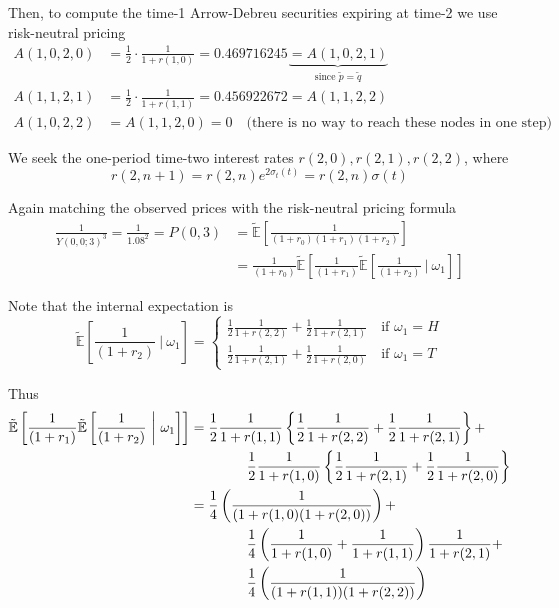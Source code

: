 \documentclass[12pt]{article}
\newcommand{\E}{\mathbb E}
\begin{document}
Then, to compute the time-1 Arrow-Debreu securities expiring at time-2 we use risk-neutral pricing
\begin{align*}
	A(1,0,2,0) &= \frac{1}{2} \cdot \frac{1}{1 + r(1,0)} = 0.469716245 \underbrace{ = A(1,0,2,1)}_{\text{since $\tilde{p} = \tilde{q}$}} \\
	A(1,1,2,1) &= \frac{1}{2} \cdot \frac{1}{1 + r(1,1)} = 0.456922672 = A(1,1,2,2) \\
	A(1,0,2,2) &= A(1,1,2,0) = 0 \quad \text{(there is no way to reach these nodes in one step)}
\end{align*}

We seek the one-period time-two interest rates $r(2,0), r(2,1), r(2,2)$, where
\begin{equation*}
	r(2,n + 1) = r(2,n)e^{2\sigma_t(t)} = r(2,n)\sigma(t)
\end{equation*}

Again matching the observed prices with the risk-neutral pricing formula
\begin{align*}
	\frac{1}{Y(0,0;3)^3} = \frac{1}{1.08^2} = P(0,3) &= \tilde{\E} \left[ \frac{1}{(1 + r_0)(1 + r_1)(1 + r_2)} \right] \\
	&= \frac{1}{(1 + r_0)} \tilde{\E} \left[ \frac{1}{(1 + r_1)} \tilde{\E} \left[ \frac{1}{(1 + r_2)} ~\bigg|~ \omega_1 \right] \right]
\end{align*}

Note that the internal expectation is
\begin{equation*}
	\tilde{\E} \left[ \frac{1}{(1 + r_2)} ~\bigg|~ \omega_1 \right] = 
	\begin{cases}
		\frac{1}{2} \frac{1}{1 + r(2,2)} + \frac{1}{2} \frac{1}{1 + r(2,1)} \quad \text{if } \omega_1 = H \\
	\frac{1}{2} \frac{1}{1 + r(2,1)} + \frac{1}{2} \frac{1}{1 + r(2,0)} \quad \text{if } \omega_1 = T 
	\end{cases}
\end{equation*}

Thus
\begin{align*}
	\tilde{\E} \left[ \frac{1}{(1 + r_1)} \tilde{\E} \left[ \frac{1}{(1 + r_2)} ~\bigg|~ \omega_1 \right] \right] &= \frac{1}{2} \frac{1}{1 + r(1,1)} \left\{ \frac{1}{2} \frac{1}{1 + r(2,2)} + \frac{1}{2} \frac{1}{1 + r(2,1)} \right\} + \\
	&\hphantom{{}={---}} \frac{1}{2} \frac{1}{1 + r(1,0)} \left\{ \frac{1}{2} \frac{1}{1 + r(2,1)} + \frac{1}{2} \frac{1}{1 + r(2,0)} \right\} \\
	&= \frac{1}{4} \left( \frac{1}{(1 + r(1,0)(1 + r(2,0))}\right) + \\
	&\hphantom{{}={---}} \frac{1}{4}\left( \frac{1}{1 + r(1,0)} + \frac{1}{1 + r(1,1)} \right) \frac{1}{1 + r(2,1)} + \\
	&\hphantom{{}={---}} \frac{1}{4} \left( \frac{1}{(1 + r(1,1))(1 + r(2,2))} \right)
\end{align*}
\end{document}
